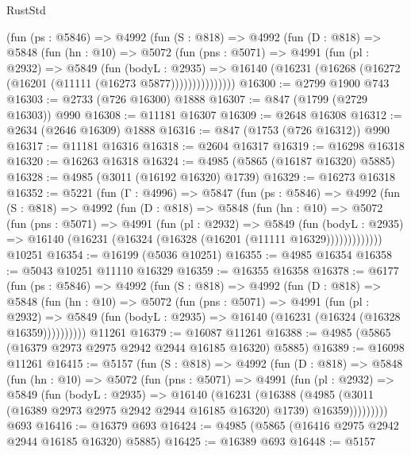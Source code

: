 \begin{lexlean}{RustStd}
\begin{coremodule}
        (fun (ps : @5846) =>
        @4992
          (fun (S : @818) =>
          @4992
            (fun (D : @818) =>
            @5848
              (fun (hn : @10) =>
              @5072
                (fun (pns : @5071) =>
                @4991
                  (fun (pl : @2932) =>
                  @5849
                    (fun (bodyL : @2935) =>
                    @16140 (@16231 (@16268 (@16272 (@16201 (@11111 (@16273 @5877)))))))))))))))
@16300 := @2799 @1900 @743
@16303 := @2733 (@726 @16300) @1888
@16307 := @847 (@1799 (@2729 @16303)) @990
@16308 := @11181 @16307
@16309 := @2648 @16308
@16312 := @2634 (@2646 @16309) @1888
@16316 := @847 (@1753 (@726 @16312)) @990
@16317 := @11181 @16316
@16318 := @2604 @16317
@16319 := @16298 @16318
@16320 := @16263 @16318
@16324 := @4985 (@5865 (@16187 @16320) @5885)
@16328 := @4985 (@3011 (@16192 @16320) @1739)
@16329 := @16273 @16318
@16352 := @5221
    (fun (Γ : @4996) =>
    @5847
      (fun (ps : @5846) =>
      @4992
        (fun (S : @818) =>
        @4992
          (fun (D : @818) =>
          @5848
            (fun (hn : @10) =>
            @5072
              (fun (pns : @5071) =>
              @4991
                (fun (pl : @2932) =>
                @5849
                  (fun (bodyL : @2935) =>
                  @16140 (@16231 (@16324 (@16328 (@16201 (@11111 @16329)))))))))))))
    @10251
@16354 := @16199 (@5036 @10251)
@16355 := @4985 @16354
@16358 := @5043 @10251 @11110 @16329
@16359 := @16355 @16358
@16378 := @6177
    (fun (ps : @5846) =>
    @4992
      (fun (S : @818) =>
      @4992
        (fun (D : @818) =>
        @5848
          (fun (hn : @10) =>
          @5072
            (fun (pns : @5071) =>
            @4991
              (fun (pl : @2932) =>
              @5849 (fun (bodyL : @2935) => @16140 (@16231 (@16324 (@16328 @16359))))))))))
    @11261
@16379 := @16087 @11261
@16388 := @4985 (@5865 (@16379 @2973 @2975 @2942 @2944 @16185 @16320) @5885)
@16389 := @16098 @11261
@16415 := @5157
    (fun (S : @818) =>
    @4992
      (fun (D : @818) =>
      @5848
        (fun (hn : @10) =>
        @5072
          (fun (pns : @5071) =>
          @4991
            (fun (pl : @2932) =>
            @5849
              (fun (bodyL : @2935) =>
              @16140
                (@16231
                  (@16388
                    (@4985
                      (@3011 (@16389 @2973 @2975 @2942 @2944 @16185 @16320) @1739)
                      @16359)))))))))
    @693
@16416 := @16379 @693
@16424 := @4985 (@5865 (@16416 @2975 @2942 @2944 @16185 @16320) @5885)
@16425 := @16389 @693
@16448 := @5157

\end{coremodule}
\end{lexlean}
